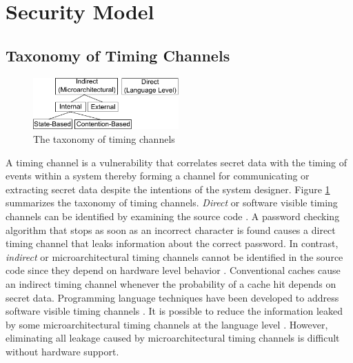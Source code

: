 \section{Security Model}
\subsection{Taxonomy of Timing Channels}
    \begin{figure}
        \begin{center}
            \includegraphics[width=2.2in]{figs/taxonomy.pdf}
            \caption{The taxonomy of timing channels}
            \label{fig:taxonomy}
        \end{center}
    \end{figure}

A timing channel is a vulnerability that correlates secret data with the  
timing of events within a system thereby forming a channel for communicating or 
extracting secret data despite the intentions of the system designer. Figure 
\ref{fig:taxonomy} summarizes the taxonomy of timing channels. \emph{Direct} or 
software visible timing channels can be identified by examining the source code 
\cite{mitigation3}. A password checking algorithm that stops as soon as an 
incorrect character is found causes a direct timing channel that leaks 
information about the correct password. In contrast, \emph{indirect} or 
microarchitectural timing channels cannot be identified in the source code 
since they depend on hardware level behavior \cite{mitigation3}. Conventional 
caches cause an indirect timing channel whenever the probability of a cache hit 
depends on secret data. Programming language techniques have been developed to 
address software visible timing channels 
\cite{timesens,mitigation1,mitigation2,mitigation3}. It is possible to reduce 
the information leaked by some microarchitectural timing channels at the 
language level \cite{mitigation3}. However, eliminating all leakage caused by 
microarchitectural timing channels is difficult without hardware support.

